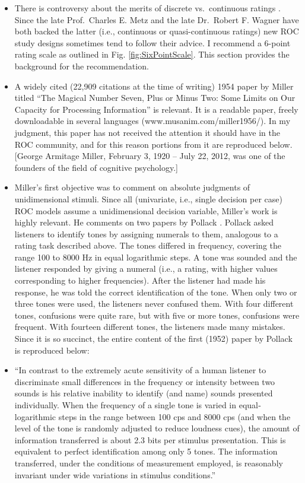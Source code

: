 \documentclass[
]{book}
\begin{document}
\begin{itemize}
\item
  There is controversy about the merits of discrete vs.~continuous ratings \citep{rockette1992use, RN2179}. Since the late Prof.~Charles E. Metz and the late Dr.~Robert F. Wagner have both backed the latter (i.e., continuous or quasi-continuous ratings) new ROC study designs sometimes tend to follow their advice. I recommend a 6-point rating scale as outlined in Fig. \ref{fig:SixPointScale}. This section provides the background for the recommendation.
\item
  A widely cited (22,909 citations at the time of writing) 1954 paper by Miller \citep{RN930} titled ``The Magical Number Seven, Plus or Minus Two: Some Limits on Our Capacity for Processing Information'' is relevant. It is a readable paper, freely downloadable in several languages (www.musanim.com/miller1956/). In my judgment, this paper has not received the attention it should have in the ROC community, and for this reason portions from it are reproduced below. {[}George Armitage Miller, February 3, 1920 -- July 22, 2012, was one of the founders of the field of cognitive psychology.{]}
\item
  Miller's first objective was to comment on absolute judgments of unidimensional stimuli. Since all (univariate, i.e., single decision per case) ROC models assume a unidimensional decision variable, Miller's work is highly relevant. He comments on two papers by Pollack \citep{RN2476, RN2474}. Pollack asked listeners to identify tones by assigning numerals to them, analogous to a rating task described above. The tones differed in frequency, covering the range 100 to 8000 Hz in equal logarithmic steps. A tone was sounded and the listener responded by giving a numeral (i.e., a rating, with higher values corresponding to higher frequencies). After the listener had made his response, he was told the correct identification of the tone. When only two or three tones were used, the listeners never confused them. With four different tones, confusions were quite rare, but with five or more tones, confusions were frequent. With fourteen different tones, the listeners made many mistakes. Since it is so succinct, the entire content of the first (1952) paper by Pollack is reproduced below:
\item
  ``In contrast to the extremely acute sensitivity of a human listener to discriminate small differences in the frequency or intensity between two sounds is his relative inability to identify (and name) sounds presented individually. When the frequency of a single tone is varied in equal‐logarithmic steps in the range between 100 cps and 8000 cps (and when the level of the tone is randomly adjusted to reduce loudness cues), the amount of information transferred is about 2.3 bits per stimulus presentation. This is equivalent to perfect identification among only 5 tones. The information transferred, under the conditions of measurement employed, is reasonably invariant under wide variations in stimulus conditions.''

\end{itemize}
\end{document}
